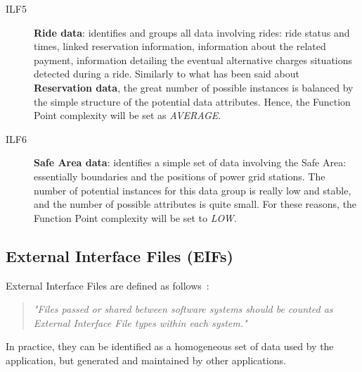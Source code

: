 \begin{description}
\item[ILF5] \textbf{Ride data}: identifies and groups all data involving rides: ride status and times, linked reservation information, information about the related payment, information detailing the eventual alternative charges situations detected during a ride. Similarly to what has been said about \textbf{Reservation data}, the great number of possible instances is balanced by the simple structure of the potential data attributes. Hence, the Function Point complexity will be set as \textit{AVERAGE}.
\item[ILF6] \textbf{Safe Area data}: identifies a simple set of data involving the Safe Area: essentially boundaries and the positions of power grid stations. The number of potential instances for this data group is really low and stable, and the number of possible attributes is quite small. For these reasons, the Function Point complexity will be set to \textit{LOW}.
\end{description}

\subsection{External Interface Files (EIFs)}
External Interface Files are defined as follows~\cite{cocomo-manual}:
\begin{quotation}
\textit{"Files passed or shared between software systems should be counted as External Interface File types within each system."}
\end{quotation}
In practice, they can be identified as a homogeneous set of data used by the application, but generated and maintained by other applications.

